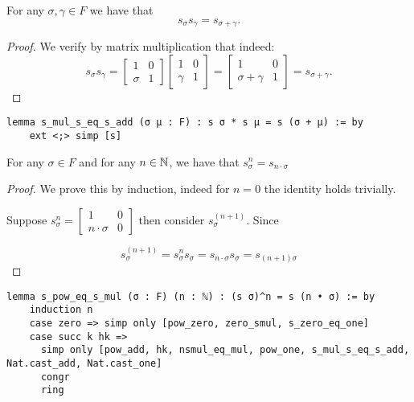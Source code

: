 \begin{lemma}
\label{SpecialMatrices.s_mul_s_eq_s_add}
\leanok
    For any $\sigma, \gamma \in F$ we have that
    \[
    s_\sigma s_\gamma = s_{\sigma + \gamma}.
    \]
\end{lemma}
\begin{proof}
\leanok
    We verify by matrix multiplication that indeed:
\begin{equation*}
    s_\sigma s_\gamma = \begin{bmatrix} 1 & 0 \\ \sigma & 1 \end{bmatrix} \begin{bmatrix} 1 & 0 \\ \gamma & 1 \end{bmatrix} = \begin{bmatrix} 1 & 0 \\ \sigma + \gamma & 1 \end{bmatrix} = s_{\sigma + \gamma}.
\end{equation*}
\end{proof}
\begin{footnotesize}
\begin{verbatim}
lemma s_mul_s_eq_s_add (σ μ : F) : s σ * s μ = s (σ + μ) := by
    ext <;> simp [s]
\end{verbatim}
\end{footnotesize}

\begin{lemma}
    \label{SpecialMatrices.s_pow_eq_s_mul}
    \leanok
    For any $\sigma \in F$ and for any $n \in \mathbb{N}$, we have that $s_\sigma^n = s_{n \cdot \sigma}$
\end{lemma}
\begin{proof}
\leanok
    We prove this by induction, indeed for $n= 0$ the identity holds trivially.

    Suppose $s_\sigma^n = \begin{bmatrix}
        1 & 0\\
        n \cdot \sigma & 0\end{bmatrix}$ then consider $s_\sigma^(n + 1)$. Since 

        \[
        s_\sigma^(n + 1) = s_\sigma^n s_\sigma = s_{n \cdot \sigma} s_\sigma = s_{(n + 1)\sigma}
        \]
\end{proof}
\begin{footnotesize}
\begin{verbatim}
lemma s_pow_eq_s_mul (σ : F) (n : ℕ) : (s σ)^n = s (n • σ) := by
    induction n
    case zero => simp only [pow_zero, zero_smul, s_zero_eq_one]
    case succ k hk =>
      simp only [pow_add, hk, nsmul_eq_mul, pow_one, s_mul_s_eq_s_add, Nat.cast_add, Nat.cast_one]
      congr
      ring
\end{verbatim}
\end{footnotesize}

